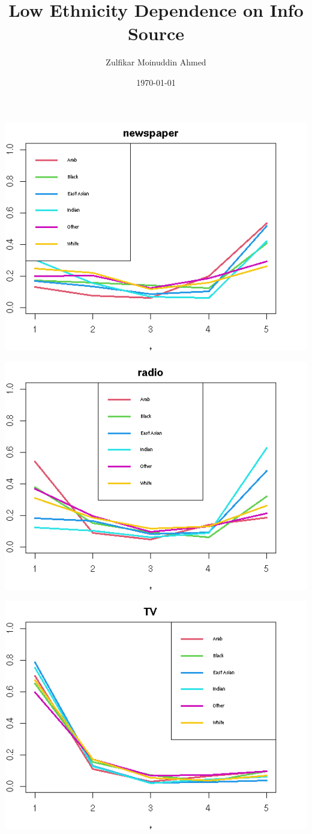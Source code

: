 \documentclass{amsart}
\title{Low Ethnicity Dependence on Info Source}
\author{Zulfikar Moinuddin Ahmed}
\date{\today}
\begin{document}
\maketitle

\includegraphics[scale=0.4]{newspaper.png}

\includegraphics[scale=0.4]{inforad.png}

\includegraphics[scale=0.4]{infotv.png}
\end{document}
